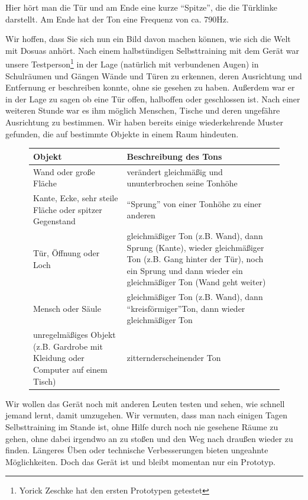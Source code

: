 \documentclass[a4paper,12pt,ngerman]{scrartcl}
\begin{document}
Hier hört man die Tür und am Ende eine kurze \enquote{Spitze}, die die Türklinke darstellt. Am Ende hat der Ton
eine Frequenz von ca. 790Hz.\par 
Wir hoffen, dass Sie sich nun ein Bild davon machen können, wie sich die Welt mit Dosuas anhört. Nach einem
halbstündigen Selbsttraining mit dem Gerät war unsere Testperson\footnote{Yorick Zeschke hat den ersten Prototypen
getestet} in der Lage (natürlich mit verbundenen Augen) in Schulräumen und Gängen
Wände und Türen zu erkennen, deren Ausrichtung und Entfernung er beschreiben konnte, ohne sie gesehen zu haben.
Außerdem war er in der Lage zu sagen ob eine Tür offen, halboffen oder geschlossen ist. Nach einer weiteren Stunde
war es ihm möglich Menschen, Tische und deren ungefähre Ausrichtung zu bestimmen. 
Wir haben bereits einige wiederkehrende Muster gefunden, die auf bestimmte Objekte in einem Raum hindeuten. 
\begin{figure}[h]
	\begin{tabular}{| p{} | p{} |}
		\hline
		Objekt & Beschreibung des Tons \\ \hline
		Wand oder große Fläche & verändert gleichmäßig und ununterbrochen seine Tonhöhe \\ \hline
		Kante, Ecke, sehr steile Fläche oder spitzer Gegenstand & \enquote{Sprung} von einer Tonhöhe zu einer 
		anderen \\ \hline
		Tür, Öffnung oder Loch & gleichmäßiger Ton (z.B. Wand), dann Sprung (Kante), wieder gleichmäßiger Ton
		(z.B. Gang hinter der Tür), noch ein Sprung und dann wieder ein gleichmäßiger Ton (Wand geht weiter) \\ \hline 
		Mensch oder Säule & gleichmäßiger Ton (z.B. Wand), dann \enquote{kreisförmiger}\footnotemark Ton, dann wieder gleichmäßiger Ton \\ \hline
		unregelmäßiges Objekt (z.B. Gardrobe mit Kleidung oder Computer auf einem Tisch) & zitternd\footnotemark erscheinender Ton \\ \hline 
	\end{tabular}
\end{figure} \par
{}
Wir wollen das Gerät noch mit
anderen Leuten testen und sehen, wie schnell jemand lernt, damit umzugehen. Wir vermuten, dass man nach einigen 
Tagen Selbsttraining im Stande ist, ohne Hilfe durch noch nie gesehene Räume zu gehen, ohne dabei irgendwo an zu
stoßen und den Weg nach draußen wieder zu finden. Längeres Üben oder technische Verbesserungen bieten ungeahnte
Möglichkeiten. Doch das Gerät ist und bleibt momentan nur ein Prototyp. 
\end{document}
